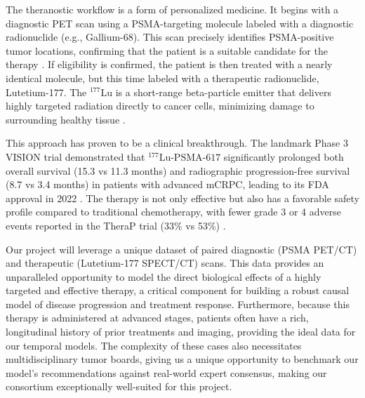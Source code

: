 \documentclass[11pt, a4paper]{article}
\begin{document}
The theranostic workflow is a form of personalized medicine. It begins with a diagnostic PET scan using a PSMA-targeting molecule labeled with a diagnostic radionuclide (e.g., Gallium-68). This scan precisely identifies PSMA-positive tumor locations, confirming that the patient is a suitable candidate for the therapy \cite{HennrichEder2022, KaewputVinjamuri2022}. If eligibility is confirmed, the patient is then treated with a nearly identical molecule, but this time labeled with a therapeutic radionuclide, Lutetium-177. The ${}^{177}\text{Lu}$ is a short-range beta-particle emitter that delivers highly targeted radiation directly to cancer cells, minimizing damage to surrounding healthy tissue \cite{HennrichEder2022, SadaghianiSheikhbahaei2022}.

This approach has proven to be a clinical breakthrough. The landmark Phase 3 VISION trial demonstrated that ${}^{177}\text{Lu-PSMA-617}$ significantly prolonged both overall survival (15.3 vs 11.3 months) and radiographic progression-free survival (8.7 vs 3.4 months) in patients with advanced mCRPC, leading to its FDA approval in 2022 \cite{TschanBorgna2022, ChandranFigg2022, RamnaraignSartor2023, JangKendi2023}. The therapy is not only effective but also has a favorable safety profile compared to traditional chemotherapy, with fewer grade 3 or 4 adverse events reported in the TheraP trial (33\% vs 53\%) \cite{HofmanEmmett2024, PatellKurian2023}.

Our project will leverage a unique dataset of paired diagnostic (PSMA PET/CT) and therapeutic (Lutetium-177 SPECT/CT) scans. This data provides an unparalleled opportunity to model the direct biological effects of a highly targeted and effective therapy, a critical component for building a robust causal model of disease progression and treatment response. Furthermore, because this therapy is administered at advanced stages, patients often have a rich, longitudinal history of prior treatments and imaging, providing the ideal data for our temporal models. The complexity of these cases also necessitates multidisciplinary tumor boards, giving us a unique opportunity to benchmark our model's recommendations against real-world expert consensus, making our consortium exceptionally well-suited for this project.
\end{document}
